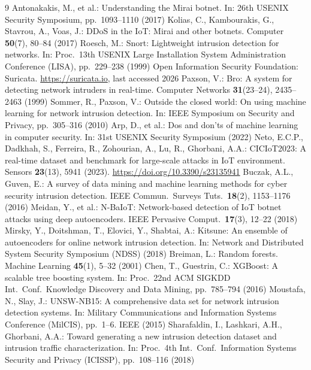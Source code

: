 \documentclass[runningheads]{llncs}
\begin{document}
\begin{thebibliography}{9}
 Antonakakis, M., et al.: Understanding the Mirai botnet. In: 26th USENIX Security Symposium, pp.~1093--1110 (2017)
 Kolias, C., Kambourakis, G., Stavrou, A., Voas, J.: DDoS in the IoT: Mirai and other botnets. Computer \textbf{50}(7), 80--84 (2017)
 Roesch, M.: Snort: Lightweight intrusion detection for networks. In: Proc.\ 13th USENIX Large Installation System Administration Conference (LISA), pp.~229--238 (1999)
 Open Information Security Foundation: Suricata. \url{https://suricata.io}, last accessed 2026
 Paxson, V.: Bro: A system for detecting network intruders in real-time. Computer Networks \textbf{31}(23--24), 2435--2463 (1999)
 Sommer, R., Paxson, V.: Outside the closed world: On using machine learning for network intrusion detection. In: IEEE Symposium on Security and Privacy, pp.~305--316 (2010)
 Arp, D., et al.: Dos and don'ts of machine learning in computer security. In: 31st USENIX Security Symposium (2022)
 Neto, E.C.P., Dadkhah, S., Ferreira, R., Zohourian, A., Lu, R., Ghorbani, A.A.: CICIoT2023: A real-time dataset and benchmark for large-scale attacks in IoT environment. Sensors \textbf{23}(13), 5941 (2023). \url{https://doi.org/10.3390/s23135941}
 Buczak, A.L., Guven, E.: A survey of data mining and machine learning methods for cyber security intrusion detection. IEEE Commun.\ Surveys Tuts.\ \textbf{18}(2), 1153--1176 (2016)
 Meidan, Y., et al.: N-BaIoT: Network-based detection of IoT botnet attacks using deep autoencoders. IEEE Pervasive Comput.\ \textbf{17}(3), 12--22 (2018)
 Mirsky, Y., Doitshman, T., Elovici, Y., Shabtai, A.: Kitsune: An ensemble of autoencoders for online network intrusion detection. In: Network and Distributed System Security Symposium (NDSS) (2018)
 Breiman, L.: Random forests. Machine Learning \textbf{45}(1), 5--32 (2001)
 Chen, T., Guestrin, C.: XGBoost: A scalable tree boosting system. In: Proc.\ 22nd ACM SIGKDD Int.\ Conf.\ Knowledge Discovery and Data Mining, pp.~785--794 (2016)
 Moustafa, N., Slay, J.: UNSW-NB15: A comprehensive data set for network intrusion detection systems. In: Military Communications and Information Systems Conference (MilCIS), pp.~1--6. IEEE (2015)
 Sharafaldin, I., Lashkari, A.H., Ghorbani, A.A.: Toward generating a new intrusion detection dataset and intrusion traffic characterization. In: Proc.\ 4th Int.\ Conf.\ Information Systems Security and Privacy (ICISSP), pp.~108--116 (2018)

\end{thebibliography}
\end{document}
